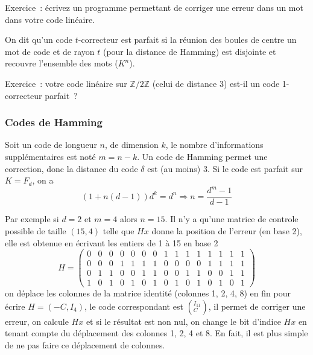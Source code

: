 \documentclass[a4paper,11pt]{article}
\newcommand{\Z}{{\mathbb{Z}}}
\begin{document}
Exercice~: écrivez un programme permettant de corriger une erreur
dans un mot dans votre code linéaire.

On dit qu'un code $t$-correcteur est parfait si la réunion des boules
de centre un mot de code et de rayon $t$ (pour la distance de Hamming)
est disjointe et recouvre l'ensemble des mots ($K^n$).

Exercice~: votre code linéaire sur $\Z/2\Z$ (celui de distance 3) 
est-il un code 1-correcteur parfait~?

\subsubsection{Codes de Hamming}
Soit un code de longueur $n$, de dimension $k$, le nombre
d'informations suppl\'ementaires est not\'e $m=n-k$. Un code
de Hamming permet une correction, donc la distance du code
$\delta$ est (au moins) 3. Si le code est parfait sur $K=F_d$, on a 
$$ (1+n(d-1))d^k=d^{n} \Rightarrow n=\frac{d^m-1}{d-1}$$

Par exemple si $d=2$ et $m=4$ alors $n=15$. 
Il n'y a qu'une matrice de controle possible de taille
$(15,4)$ telle que $Hx$ donne la position de l'erreur (en base 2),
elle est obtenue en \'ecrivant les entiers de 1 \`a 15 en base 2
$$ H=\left( \begin{array}{ccccccccccccccc}
0 & 0 & 0 & 0 & 0 & 0 & 0 & 1 & 1 & 1 & 1 & 1 & 1 & 1 & 1 \\
0 & 0 & 0 & 1 & 1 & 1 & 1 & 0 & 0 & 0 & 0 & 1 & 1 & 1 & 1 \\
0 & 1 & 1 & 0 & 0 & 1 & 1 & 0 & 0 & 1 & 1 & 0 & 0 & 1 & 1 \\
1 & 0 & 1 & 0 & 1 & 0 & 1 & 0 & 1 & 0 & 1 & 0 & 1 & 0 & 1
 \end{array} \right)$$
on d\'eplace les colonnes de la matrice identit\'e 
(colonnes 1, 2, 4, 8)
en fin pour \'ecrire $H=(-C,I_4)$, le code correspondant est
$\left( ^{I_{11}} _C \right)$, il permet de corriger une erreur,
on calcule $Hx$ et si le r\'esultat est non nul, on change le
bit d'indice $Hx$ en tenant compte du d\'eplacement des colonnes
1, 2, 4 et 8. En fait, il est plus simple de ne pas faire ce
d\'eplacement de colonnes.
\end{document}

